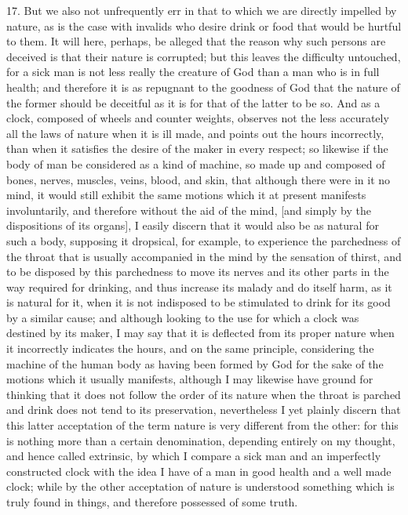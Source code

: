 17. But we also not unfrequently err in that to which we are directly impelled by nature, as is the case with invalids who desire drink or food that would be hurtful to them. It will here, perhaps, be alleged that the reason why such persons are deceived is that their nature is corrupted; but this leaves the difficulty untouched, for a sick man is not less really the creature of God than a man who is in full health; and therefore it is as repugnant to the goodness of God that the nature of the former should be deceitful as it is for that of the latter to be so. And as a clock, composed of wheels and counter weights, observes not the less accurately all the laws of nature when it is ill made, and points out the hours incorrectly, than when it satisfies the desire of the maker in every respect; so likewise if the body of man be considered as a kind of machine, so made up and composed of bones, nerves, muscles, veins, blood, and skin, that although there were in it no mind, it would still exhibit the same motions which it at present manifests involuntarily, and therefore without the aid of the mind, [and simply by the dispositions of its organs], I easily discern that it would also be as natural for such a body, supposing it dropsical, for example, to experience the parchedness of the throat that is usually accompanied in the mind by the sensation of thirst, and to be disposed by this parchedness to move its nerves and its other parts in the way required for drinking, and thus increase its malady and do itself harm, as it is natural for it, when it is not indisposed to be stimulated to drink for its good by a similar cause; and although looking to the use for which a clock was destined by its maker, I may say that it is deflected from its proper nature when it incorrectly indicates the hours, and on the same principle, considering the machine of the human body as having been formed by God for the sake of the motions which it usually manifests, although I may likewise have ground for thinking that it does not follow the order of its nature when the throat is parched and drink does not tend to its preservation, nevertheless I yet plainly discern that this latter acceptation of the term nature is very different from the other: for this is nothing more than a certain denomination, depending entirely on my thought, and hence called extrinsic, by which I compare a sick man and an imperfectly constructed clock with the idea I have of a man in good health and a well made clock; while by the other acceptation of nature is understood something which is truly found in things, and therefore possessed of some truth.

